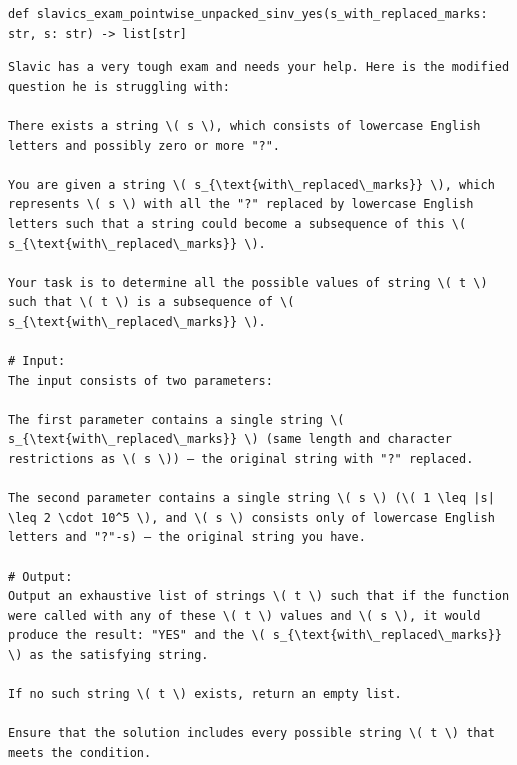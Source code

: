 \documentclass[acmsmall,screen,nonacm]{acmart}
\begin{document}
{\scriptsize
\begin{tcolorbox}[mybox,breakable,title={Set-valued partial inverse problem w.r.t. Yes}]
\begin{verbatim}
def slavics_exam_pointwise_unpacked_sinv_yes(s_with_replaced_marks: str, s: str) -> list[str]
\end{verbatim}
\begin{verbatim}
Slavic has a very tough exam and needs your help. Here is the modified question he is struggling with:

There exists a string \( s \), which consists of lowercase English letters and possibly zero or more "?".

You are given a string \( s_{\text{with\_replaced\_marks}} \), which represents \( s \) with all the "?" replaced by lowercase English letters such that a string could become a subsequence of this \( s_{\text{with\_replaced\_marks}} \).

Your task is to determine all the possible values of string \( t \) such that \( t \) is a subsequence of \( s_{\text{with\_replaced\_marks}} \).

# Input:
The input consists of two parameters:

The first parameter contains a single string \( s_{\text{with\_replaced\_marks}} \) (same length and character restrictions as \( s \)) — the original string with "?" replaced.

The second parameter contains a single string \( s \) (\( 1 \leq |s| \leq 2 \cdot 10^5 \), and \( s \) consists only of lowercase English letters and "?"-s) — the original string you have.

# Output:
Output an exhaustive list of strings \( t \) such that if the function were called with any of these \( t \) values and \( s \), it would produce the result: "YES" and the \( s_{\text{with\_replaced\_marks}} \) as the satisfying string.

If no such string \( t \) exists, return an empty list.

Ensure that the solution includes every possible string \( t \) that meets the condition.
\end{verbatim}
\end{tcolorbox}
}
\end{document}
